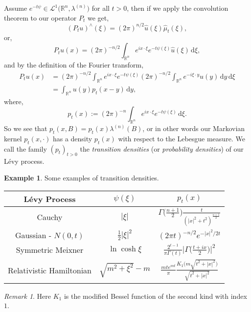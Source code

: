 \documentclass[a4paper, 12pt]{report}
\theoremstyle{remark}
\newtheorem{remark}[theorem]{Remark}
\theoremstyle{definition}
\newtheorem{example}[theorem]{Example}
\begin{document}
Assume $e^{-t\psi} \in \mathcal{L}^1\big(\mathbb{R}^n, \lambda^{(n)}\big)$ for all $t > 0$, then if we apply the convolution theorem to our operator $P_t$ we get,
$$
(P_tu)^\wedge(\xi) = (2\pi)^{n/2}\hat{u}(\xi)\hat{\mu}_t(\xi),
$$
or,
$$
P_tu(x) = (2\pi)^{-n/2}\int_{\mathbb{R}^n}e^{ix\cdot\xi}e^{-t\psi(\xi)}\hat{u}(\xi)\,\mathrm{d}\xi,
$$
and by the definition of the Fourier transform,
$$
\begin{aligned}
P_tu(x) & = (2\pi)^{-n/2}\int_{\mathbb{R}^n}e^{ix\cdot\xi}e^{-t\psi(\xi)}(2\pi)^{-n/2}\int_{\mathbb{R}^n}e^{-i\xi\cdot y}u(y)\,\mathrm{d}y\,\mathrm{d}\xi\\
& = \int_{\mathbb{R}^n}u(y)p_t(x - y)\,\mathrm{d}y,
\end{aligned}
$$
where,
\begin{equation}\label{TDfLP}
p_t(x) := (2\pi)^{-n}\int_{\mathbb{R}^n}e^{ix\cdot\xi}e^{-t\psi(\xi)}\,\mathrm{d}\xi.
\end{equation}
So we see that $p_t(x, B) = p_t(x)\lambda^{(n)}(B)$, or in other words our Markovian kernel $p_t(x, \cdot)$ has a density $p_t(x)$ with respect to the Lebesgue measure.  We call the family $(p_t)_{t > 0}$ the \emph{transition densities} (or \emph{probability densities}) of our L\'evy process.

\begin{example}
Some examples of transition densities.
\begin{center}
\begin{tabular}{c | c | c}
L\'evy Process & $\psi(\xi)$ & $p_t(x)$\\
\hline
Cauchy & $|\xi|$ & $\Gamma\big(\frac{n + 1}{2}\big)\frac{t}{(|x|^2 + t^2)^\frac{n + 1}{2}}$\\
Gaussian - $N(0, t)$ & $\frac{1}{2}|\xi|^2$ & $(2\pi t)^{-n/2}e^{-|x|^2/2t}$\\
Symmetric Meixner & $\ln\cosh\xi$ & $\frac{2^{t - 1}}{\pi\Gamma(t)}\big|\Gamma\big(\frac{t + ix}{2}\big)\big|^2$\\
Relativistic Hamiltonian & $\sqrt{m^2 + \xi^2} - m$ & $\frac{mte^{mt}}{\pi}\frac{K_1\big(m\sqrt{t^2 + |x|^2}\big)}{\sqrt{t^2 + |x|^2}}$
\end{tabular}
\end{center}

\end{example}
\begin{remark}
Here $K_1$ is the modified Bessel function of the second kind with index $1$.
\end{remark}
\end{document}
